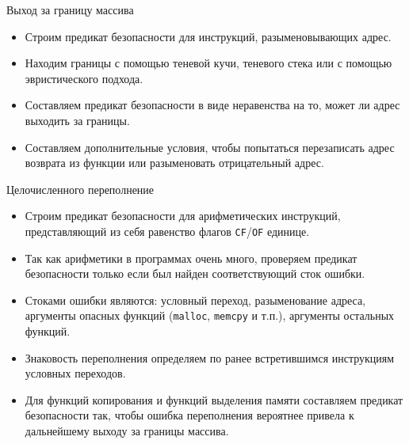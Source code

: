 \documentclass[10pt]{beamer}
\begin{document}
\begin{frame}{Выход за границу массива}
\begin{itemize}
    \item Строим предикат безопасности для инструкций, разыменовывающих адрес.
    \item Находим границы с помощью теневой кучи, теневого стека или с помощью
        эвристического подхода.
    \item Составляем предикат безопасности в виде неравенства на то, может ли
        адрес выходить за границы.
    \item Составляем дополнительные условия, чтобы попытаться перезаписать адрес
        возврата из функции или разыменовать отрицательный адрес.
\end{itemize}
\end{frame}

\begin{frame}{Целочисленного переполнение}
\begin{itemize}
    \item Строим предикат безопасности для арифметических инструкций,
        представляющий из себя равенство флагов \texttt{CF}/\texttt{OF} единице.
    \item Так как арифметики в программах очень много, проверяем предикат
        безопасности только если был найден соответствующий сток ошибки.
    \item Стоками ошибки являются: условный переход, разыменование
        адреса, аргументы опасных функций (\texttt{malloc}, \texttt{memcpy} и
        т.п.),
        аргументы остальных функций.
    \item Знаковость переполнения определяем по ранее встретившимся инструкциям
        условных переходов.
    \item Для функций копирования и функций выделения памяти составляем предикат
        безопасности так, чтобы ошибка переполнения вероятнее привела к
        дальнейшему выходу за границы массива.
\end{itemize}
\end{frame}
\end{document}
